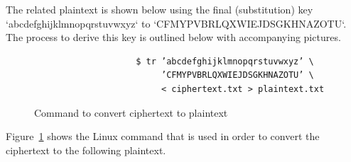 \documentclass[12pt]{article}
\begin{document}
The related plaintext is shown below using the final (substitution) key `abcdefghijklmnopqrstuvwxyz` to `CFMYPVBRLQXWIEJDSGKHNAZOTU`. The process to derive this key is outlined below with accompanying pictures.

\begin{figure}[H]
    \begin{center}
        \begin{verbatim}
                    $ tr ’abcdefghijklmnopqrstuvwxyz’ \
                         ’CFMYPVBRLQXWIEJDSGKHNAZOTU’ \
                         < ciphertext.txt > plaintext.txt
        \end{verbatim}
    \end{center}{}
    \caption{Command to convert ciphertext to plaintext}
    \label{fig:c23}
\end{figure}

Figure~\ref{fig:c23} shows the Linux command that is used in order to convert the ciphertext to the following plaintext.
\end{document}
